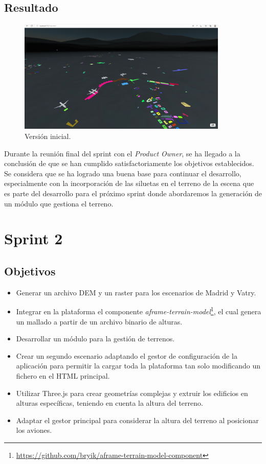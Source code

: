 \documentclass[a4paper, 11pt]{book}
\begin{document}
\subsection{Resultado}
\begin{figure}[H]
  \centering
  \includegraphics[width=10cm, keepaspectratio]{img/Sprint1.png}
  \caption{Versión inicial.}
  \label{fig:sprint1}
\end{figure}
Durante la reunión final del sprint con el \emph{Product Owner}, se ha llegado a la conclusión de que se han cumplido satisfactoriamente los objetivos establecidos. Se considera que se ha logrado una buena base para continuar el desarrollo, especialmente con la incorporación de las siluetas en el terreno de la escena que es parte del desarrollo para el próximo sprint donde abordaremos la generación de un módulo que gestiona el terreno.
\section{Sprint 2}
\subsection{Objetivos}
\begin{itemize}
    \item Generar un archivo DEM y un raster para los escenarios de Madrid y Vatry.
    \item Integrar en la plataforma el componente \emph{aframe-terrain-model}\footnote{\url{https://github.com/bryik/aframe-terrain-model-component}}, el cual genera un mallado a partir de un archivo binario de alturas.
    \item Desarrollar un módulo para la gestión de terrenos.
    \item Crear un segundo escenario adaptando el gestor de configuración de la aplicación para permitir la cargar toda la plataforma tan solo modificando un fichero en el HTML principal.
    \item Utilizar Three.js para crear geometrías complejas y extruir los edificios en alturas específicas, teniendo en cuenta la altura del terreno.
    \item Adaptar el gestor principal para considerar la altura del terreno al posicionar los aviones.
\end{itemize}
\end{document}
